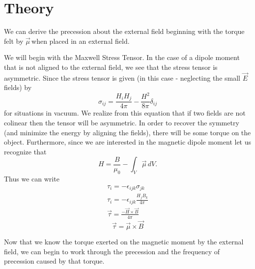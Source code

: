 \documentclass{article}
\newcommand{\dipole}{$\vec{\mu}\,$}
\newcommand{\E}{$\vec{E}\,$}
\begin{document}
\section{Theory}
	We can derive the precession about the external field beginning with the torque felt by \dipole when placed in an external field.

	We will begin with the Maxwell Stress Tensor.  In the case of a dipole moment that is not aligned to the external field, we see that the stress tensor is asymmetric.  Since the stress tensor is given (in this case - neglecting the small \E fields) by
	\begin{equation*}
		\sigma_{ij} = \frac{H_iH_j}{4\pi} - \frac{H^2}{8\pi}\delta_{ij}
	\end{equation*}
	for situations in vacuum.  We realize from this equation that if two fields are not colinear then the tensor will be asymmetric.  In order to recover the symmetry (and minimize the energy by aligning the fields), there will be some torque on the object.  Furthermore, since we are interested in the magnetic dipole moment let us recognize that
	\begin{equation*}
		H = \frac{B}{\mu_0} - \int_{V}\vec{\mu}\,dV.
	\end{equation*}
	Thus we can write
	\begin{gather*}
		\tau_i = -\epsilon_{ijk}\sigma_{jk}\\
		\tau_i = -\epsilon_{ijk}\frac{H_jB_k}{4\pi}\\
		\vec{\tau} = \frac{-\vec{H} \times \vec{B}}{4\pi}
	\end{gather*}
	\begin{equation}
		\vec{\tau} = \vec{\mu} \times \vec{B}
	\end{equation}

	Now that we know the torque exerted on the magnetic moment by the external field, we can begin to work through the precession and the frequency of precession caused by that torque.
\end{document}
